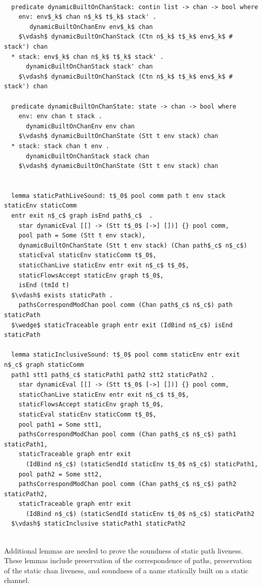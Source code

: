 \documentclass[letterpaper, 11pt]{report}
\begin{document}
\begin{lstlisting}[language=logic, mathescape]

  predicate dynamicBuiltOnChanStack: contin list -> chan -> bool where
    env: env$_k$ chan n$_k$ t$_k$ stack' .
       dynamicBuiltOnChanEnv env$_k$ chan
    $\vdash$ dynamicBuiltOnChanStack (Ctn n$_k$ t$_k$ env$_k$ # stack') chan
  * stack: env$_k$ chan n$_k$ t$_k$ stack' .
      dynamicBuiltOnChanStack stack' chan
    $\vdash$ dynamicBuiltOnChanStack (Ctn n$_k$ t$_k$ env$_k$ # stack') chan
  
  predicate dynamicBuiltOnChanState: state -> chan -> bool where
    env: env chan t stack . 
      dynamicBuiltOnChanEnv env chan
    $\vdash$ dynamicBuiltOnChanState (Stt t env stack) chan
  * stack: stack chan t env .
      dynamicBuiltOnChanStack stack chan
    $\vdash$ dynamicBuiltOnChanState (Stt t env stack) chan


  lemma staticPathLiveSound: t$_0$ pool comm path t env stack staticEnv staticComm
  entr exit n$_c$ graph isEnd path$_c$  . 
    star dynamicEval [[] -> (Stt t$_0$ [->] [])] {} pool comm,
    pool path = Some (Stt t env stack),
    dynamicBuiltOnChanState (Stt t env stack) (Chan path$_c$ n$_c$)
    staticEval staticEnv staticComm t$_0$,
    staticChanLive staticEnv entr exit n$_c$ t$_0$,
    staticFlowsAccept staticEnv graph t$_0$, 
    isEnd (tmId t)
  $\vdash$ exists staticPath . 
    pathsCorrespondModChan pool comm (Chan path$_c$ n$_c$) path staticPath
  $\wedge$ staticTraceable graph entr exit (IdBind n$_c$) isEnd staticPath

  lemma staticInclusiveSound: t$_0$ pool comm staticEnv entr exit n$_c$ graph staticComm
  path1 stt1 path$_c$ staticPath1 path2 stt2 staticPath2 .
    star dynamicEval [[] -> (Stt t$_0$ [->] [])] {} pool comm, 
    staticChanLive staticEnv entr exit n$_c$ t$_0$, 
    staticFlowsAccept staticEnv graph t$_0$, 
    staticEval staticEnv staticComm t$_0$, 
    pool path1 = Some stt1, 
    pathsCorrespondModChan pool comm (Chan path$_c$ n$_c$) path1 staticPath1, 
    staticTraceable graph entr exit
      (IdBind n$_c$) (staticSendId staticEnv t$_0$ n$_c$) staticPath1, 
    pool path2 = Some stt2, 
    pathsCorrespondModChan pool comm (Chan path$_c$ n$_c$) path2 staticPath2, 
    staticTraceable graph entr exit
      (IdBind n$_c$) (staticSendId staticEnv t$_0$ n$_c$) staticPath2
  $\vdash$ staticInclusive staticPath1 staticPath2


\end{lstlisting}

Additional lemmas are needed to prove the soundness of static path liveness.
These lemmas include preservation of the correspondence of paths,
preservation of the static chan liveness,
and soundness of a name statically built on a static channel.
\end{document}
